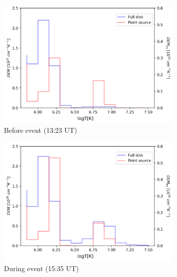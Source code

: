 \begin{figure}[h!]

    \begin{subfigure}[b]{0.3\textwidth}
        \centering
        \includegraphics[width=\textwidth]{images/dem_profile_before_event_2021_oct_28.png}
        \caption{Before event (13:23 UT)}
    \end{subfigure}
    \hfill
    \begin{subfigure}[b]{0.3\textwidth}
        \centering
        \includegraphics[width=\textwidth]{images/dem_profile_during_event_2021_oct_28.png}
        \caption{During event (15:35 UT)}
    \end{subfigure}
    \hfill
    \begin{subfigure}[b]{0.3\textwidth}
        \centering

\end{subfigure}
\end{figure}
